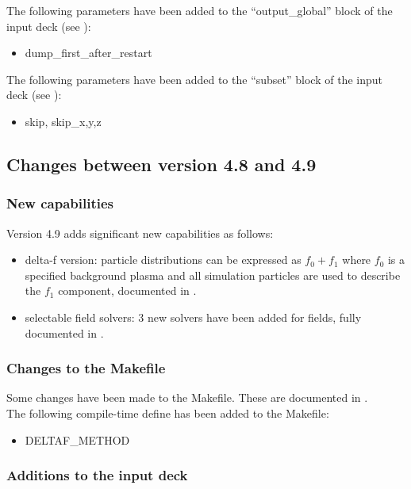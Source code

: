 \noindent The following parameters have been added to the ``output\_global''
block of the input deck (see ):
\begin{itemize}
\item dump\_first\_after\_restart
\end{itemize}
\bigskip

\noindent The following parameters have been added to the ``subset'' block of
the input deck (see ):
\begin{itemize}
\item skip, skip\_{x,y,z}
\end{itemize}
\bigskip

\subsection{Changes between version 4.8 and 4.9}

\subsubsection{New capabilities}
Version 4.9 adds significant new capabilities as follows:

\begin{itemize}
\item delta-f version: particle distributions can be expressed as
   $f_0 + f_1$ where $f_0$ is a specified background plasma and all simulation
   particles are used to describe the $f_1$ component, documented in
   .
\item selectable field solvers: 3 new solvers have been added for fields, fully
   documented in .
\end{itemize}
\bigskip

\subsubsection{Changes to the Makefile}

Some changes have been made to the Makefile. These are documented in
.\\

\noindent The following compile-time define has been added to the Makefile:
\begin{itemize}
\item DELTAF\_METHOD
\end{itemize}
\bigskip

\subsubsection{Additions to the input deck}

